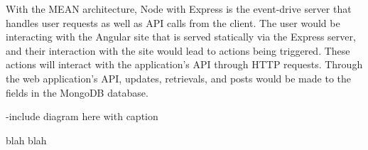 \documentclass[12pt]{article}
\begin{document}
With the MEAN architecture, Node with Express is the event-drive server that handles user requests as well as API calls from the client. The user would be interacting with the Angular site that is served statically via the Express server, and their interaction with the site would lead to actions being triggered. These actions will interact with the application's API through HTTP requests. Through the web application's API, updates, retrievals, and posts would be made to the fields in the MongoDB database.

-include diagram here with caption

\newpage

blah blah

\newpage
\end{document}
